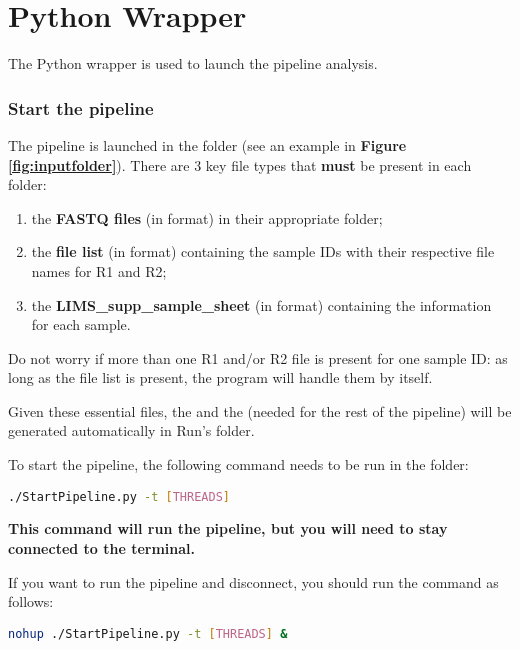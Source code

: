 \vspace{+20pt}
\part{Python Wrapper}
The Python wrapper is used to launch the pipeline analysis. 

\section{Start the pipeline}
The pipeline is launched in the  folder (see an example in \textbf{Figure \ref{fig:inputfolder}}). There are 3 key file types that \textbf{must} be present in each  folder:
\begin{enumerate}
    \item the \textbf{FASTQ files} (in  format) in their appropriate folder;
    \item the \textbf{file list} (in  format) containing the sample IDs with their respective file names for R1 and R2;
    \item the \textbf{LIMS\_supp\_sample\_sheet} (in  format) containing the information for each sample.
\end{enumerate}

Do not worry if more than one R1 and/or R2 file is present for one sample ID: as long as the file list is present, the program will handle them by itself.

Given these essential files, the  and the  (needed for the rest of the pipeline) will be generated automatically in Run's folder.

To start the pipeline, the following command needs to be run in the  folder:

\begin{center}
    \lstinline[language=bash]{./StartPipeline.py -t [THREADS]}
\end{center}

\textcolor{Crimson}{\faExclamationCircle} \textbf{This command will run the pipeline, but you will need to stay connected to the terminal. }

If you want to run the pipeline and disconnect, you should run the command as follows:

\begin{center}
    \lstinline[language=bash]{nohup ./StartPipeline.py -t [THREADS] &}
\end{center}

